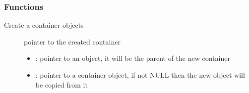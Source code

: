 \documentclass[letterpaper,10pt,english]{sphinxmanual}
\begin{document}

\begin{fulllineitems}
\label{\detokenize{object-types/cont:_CPPv4Ut7_anon_55}}%
\pysigstartmultiline
{}%
\pysigstopmultiline
{}

\begin{fulllineitems}
\label{\detokenize{object-types/cont:_CPPv418LV_CONT_STYLE_MAIN}}%
\pysigstartmultiline
{}%
\pysigstopmultiline
\end{fulllineitems}


\end{fulllineitems}

\subsubsection*{Functions}

\begin{fulllineitems}
\label{\detokenize{object-types/cont:_CPPv414lv_cont_createP8lv_obj_tPK8lv_obj_t}}%
\pysigstartmultiline
{}\label{\detokenize{object-types/cont:lv__cont_8h_1a152656507baa9b1d1874719624e6fa16}}%
\pysigstopmultiline
Create a container objects \begin{description}
\item[{}] \leavevmode
pointer to the created container 

\item[{}] \leavevmode\begin{itemize}
\item {} 
: pointer to an object, it will be the parent of the new container 

\item {} 
: pointer to a container object, if not NULL then the new object will be copied from it 

\end{itemize}

\end{description}


\end{fulllineitems}
\end{document}
